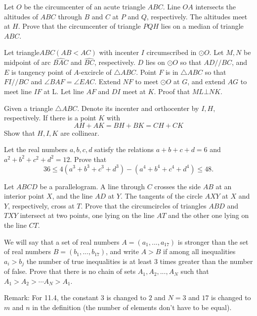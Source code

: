 \documentclass[11pt]{scrartcl}
\begin{document}
\begin{problem}[2139114147569608698]
Let $O$ be the circumcenter of an acute triangle $ABC$. Line $OA$ intersects the altitudes of $ABC$ through $B$ and $C$ at $P$ and $Q$, respectively. The altitudes meet at $H$. Prove that the circumcenter of triangle $PQH$ lies on a median of triangle $ABC$.
\end{problem}
\begin{problem}[239934686230450]
Let triangle$ABC(AB<AC)$ with incenter $I$ circumscribed in $\odot O$. Let $M,N$ be midpoint of arc $\widehat{BAC}$ and $\widehat{BC}$, respectively. $D$ lies on $\odot O$ so that $AD//BC$, and $E$ is tangency point of $A$-excircle of $\bigtriangleup ABC$. Point $F$ is in $\bigtriangleup ABC$ so that $FI//BC$ and $\angle BAF=\angle EAC$. Extend $NF$ to meet $\odot O$ at $G$, and extend $AG$ to meet line $IF$ at L. Let line $AF$ and $DI$ meet at $K$. Proof that $ML\bot NK$.
\end{problem}
\begin{problem}[3906812380515301028]
Given a triangle $ \triangle ABC $. Denote its incenter and orthocenter by $ I, H $, respectively. If there is a point $ K $ with$$ AH+AK = BH+BK = CH+CK $$Show that $ H, I, K $ are collinear.
\end{problem}
\begin{problem}[580405361636802]
Let the real numbers $a,b,c,d$ satisfy the relations $a+b+c+d=6$ and $a^2+b^2+c^2+d^2=12.$ Prove that
\[36 \leq 4 \left(a^3+b^3+c^3+d^3\right) - \left(a^4+b^4+c^4+d^4 \right) \leq 48.\]
\end{problem}
\begin{problem}[579228243242060]
Let $ABCD$ be a parallelogram. A line through $C$ crosses the side $AB$ at an interior point $X$,
and the line $AD$ at $Y$. The tangents of the circle $AXY$ at $X$ and $Y$, respectively, cross at $T$.
Prove that the circumcircles of triangles $ABD$ and $TXY$ intersect at two points, one lying on the line $AT$ and the other one lying on the line $CT$.
\end{problem}
\begin{problem}[35724831608408]
	We will say that a set of real numbers $A = (a_1,... , a_{17})$ is stronger than the set of real numbers $B = (b_1, . . . , b_{17})$, and write $A >B$ if among all inequalities $a_i > b_j$ the number of true inequalities is at least $3$ times greater than the number of false. Prove that there is no chain of sets $A_1, A_2, .  .  .  , A_N$ such that $A_1>A_2> \cdots A_N>A_1$.

Remark: For 11.4, the constant $3$ is changed to $2$ and $N=3$ and $17$ is changed to $m$ and $n$ in the definition (the number of elements don't have to be equal).
\end{problem}
\end{document}
